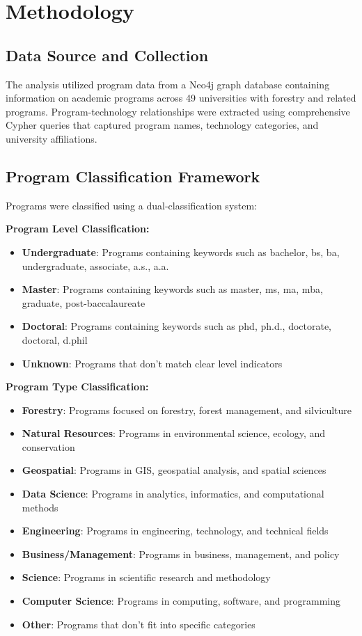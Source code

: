 \documentclass[12pt]{article}
\begin{document}
\section{Methodology}

\subsection{Data Source and Collection}
The analysis utilized program data from a Neo4j graph database containing information on academic programs across 49 universities with forestry and related programs. Program-technology relationships were extracted using comprehensive Cypher queries that captured program names, technology categories, and university affiliations.

\subsection{Program Classification Framework}
Programs were classified using a dual-classification system:

\textbf{Program Level Classification:}
\begin{itemize}
    \item \textbf{Undergraduate}: Programs containing keywords such as bachelor, bs, ba, undergraduate, associate, a.s., a.a.
    \item \textbf{Master}: Programs containing keywords such as master, ms, ma, mba, graduate, post-baccalaureate
    \item \textbf{Doctoral}: Programs containing keywords such as phd, ph.d., doctorate, doctoral, d.phil
    \item \textbf{Unknown}: Programs that don't match clear level indicators
\end{itemize}

\textbf{Program Type Classification:}
\begin{itemize}
    \item \textbf{Forestry}: Programs focused on forestry, forest management, and silviculture
    \item \textbf{Natural Resources}: Programs in environmental science, ecology, and conservation
    \item \textbf{Geospatial}: Programs in GIS, geospatial analysis, and spatial sciences
    \item \textbf{Data Science}: Programs in analytics, informatics, and computational methods
    \item \textbf{Engineering}: Programs in engineering, technology, and technical fields
    \item \textbf{Business/Management}: Programs in business, management, and policy
    \item \textbf{Science}: Programs in scientific research and methodology
    \item \textbf{Computer Science}: Programs in computing, software, and programming
    \item \textbf{Other}: Programs that don't fit into specific categories
\end{itemize}
\end{document}
